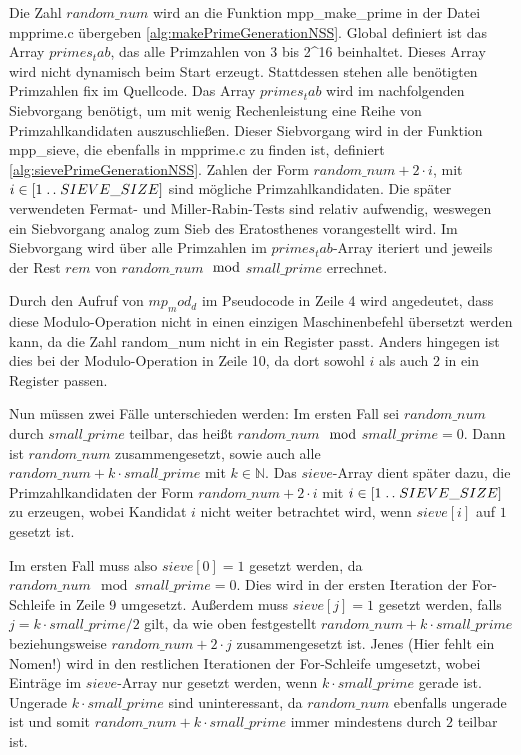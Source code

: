 Die Zahl $random\_num$ wird an die Funktion mpp_make_prime in der Datei mpprime.c übergeben \ref{alg:makePrimeGenerationNSS}.
Global definiert ist das Array $primes_tab$, das alle Primzahlen von 3 bis 2^16 beinhaltet. Dieses Array wird nicht dynamisch beim Start erzeugt. Stattdessen stehen alle benötigten Primzahlen fix im Quellcode. 
Das Array $primes_tab$ wird im nachfolgenden Siebvorgang benötigt, um mit wenig Rechenleistung eine Reihe von Primzahlkandidaten auszuschließen.
Dieser Siebvorgang wird in der Funktion mpp_sieve, die ebenfalls in mpprime.c zu finden ist, definiert \ref{alg:sievePrimeGenerationNSS}.
Zahlen der Form $random\_num + 2 \cdot i$, mit $i \in [1\mathrel{{.}\,{.}}\nobreak SIEVE\_SIZE]$ sind mögliche Primzahlkandidaten.
Die später verwendeten Fermat- und Miller-Rabin-Tests sind relativ aufwendig, weswegen ein Siebvorgang analog zum Sieb des Eratosthenes vorangestellt wird.
Im Siebvorgang wird über alle Primzahlen im $primes_tab$-Array iteriert und jeweils der Rest $rem$ von $random\_num$$\mod$$small\_prime$ errechnet.

Durch den Aufruf von $mp_mod_d$ im Pseudocode in Zeile 4 wird angedeutet, dass diese Modulo-Operation nicht in einen einzigen Maschinenbefehl übersetzt werden kann, da die Zahl random\_num nicht in ein Register passt. Anders hingegen ist dies bei der Modulo-Operation in Zeile 10, da dort sowohl $i$ als auch 2 in ein Register passen.

Nun müssen zwei Fälle unterschieden werden:
Im ersten Fall sei $random\_num$ durch $small\_prime$ teilbar, das heißt $random\_num$$\mod$$small\_prime = 0$.
Dann ist $random\_num$ zusammengesetzt, sowie auch alle $random\_num + k \cdot small\_prime$ mit $k \in \mathbb{N}$.
Das $sieve$-Array dient später dazu, die Primzahlkandidaten der Form $random\_num + 2 \cdot i$ mit $i \in [1\mathrel{{.}\,{.}}\nobreak SIEVE\_SIZE]$ zu erzeugen, wobei Kandidat $i$ nicht weiter betrachtet wird, wenn $sieve[i]$ auf $1$ gesetzt ist.

Im ersten Fall muss also $sieve[0] = 1$ gesetzt werden, da $random\_num \mod small\_prime = 0$.
Dies wird in der ersten Iteration der For-Schleife in Zeile 9 umgesetzt.
Außerdem muss $sieve[j] = 1$ gesetzt werden, falls $j = k \cdot small\_prime / 2$ gilt, da wie oben festgestellt $random\_num + k \cdot small\_prime$ beziehungsweise $random\_num + 2 \cdot j$ zusammengesetzt ist.
Jenes (Hier fehlt ein Nomen!) wird in den restlichen Iterationen der For-Schleife umgesetzt, wobei Einträge im $sieve$-Array nur gesetzt werden, wenn $k \cdot small\_prime$ gerade ist.
Ungerade $k \cdot small\_prime$ sind uninteressant, da $random\_num$ ebenfalls ungerade ist und somit $random\_num + k \cdot small\_prime$ immer mindestens durch $2$ teilbar ist.

